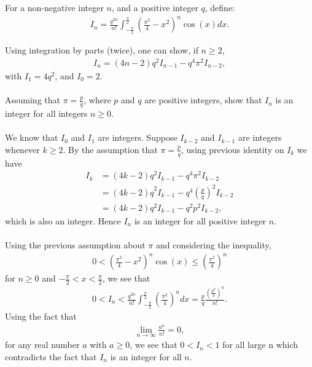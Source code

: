 \documentclass{report}
\begin{document}
		For a non-negative integer $n$, and a positive integer $q$, define:
		\begin{align*}
			I_n = \frac{q^{2n}}{n!} \int_{-\frac{\pi}{2}}^{\frac{\pi}{2}} {\left(\frac{\pi^2}{4} - x^2\right)}^n \cos(x) dx.
		\end{align*}

		Using integration by parts (twice), one can show, if $n \geq 2$,
		\begin{align*}
			I_n = (4n - 2)q^2 I_{n-1} - q^4 \pi^2 I_{n-2},
		\end{align*}
		with $I_1 = 4q^2$, and $I_0 = 2$.
		\\ \\
		Assuming that $\pi = \frac{p}{q}$, where $p$ and $q$ are positive integers, show that $I_n$ is an integer for all integers $n \geq 0$.
		\\ \\
		We know that $I_0$ and $I_1$ are integers. Suppose $I_{k-2}$ and $I_{k-1}$ are integers whenever $k \geq 2$. By the assumption that $\pi = \frac{p}{q}$, using previous identity on $I_k$ we have
		\begin{align*}
			I_k &= (4k - 2)q^2I_{k-1} - q^4 \pi^2 I_{k-2}	\\
			    &= {(4k - 2)q}^2I_{k-1} - q^4 {(\frac{p}{q})}^2 I_{k-2}	\\
			    &= (4k - 2)q^2I_{k-1} - q^2 p^2 I_{k-2},
		\end{align*}
		which is also an integer. Hence $I_n$ is an integer for all positive integer $n$.
		\\ \\
		Using the previous assumption about $\pi$ and considering the inequality,
		\begin{align*}
			0 < \left(\frac{\pi^2}{4} - x^2\right)^n \cos(x) \leq {\left(\frac{\pi^2}{4}\right)}^n
		\end{align*}
		for $n \geq 0$ and $-\frac{\pi}{2} < x < \frac{\pi}{2}$, we see that
		\begin{align*}
			0 < I_n < \frac{q^{2n}}{n!} \int_{-\frac{\pi}{2}}^{\frac{\pi}{2}} \left(\frac{\pi^2}{4}\right)^n dx = \frac{p}{q} \frac{{\left(\frac{p^2}{4}\right)}^n}{n!}.
		\end{align*}
		Using the fact that
		\begin{align*}
			\lim_{n\to \infty} \frac{a^n}{n!} = 0,
		\end{align*}
		for any real number $a$ with $a \geq 0$, we see that $0 < I_n < 1$ for all large n which contradicts the fact that $I_n$ is an integer for all $n$.
\end{document}
